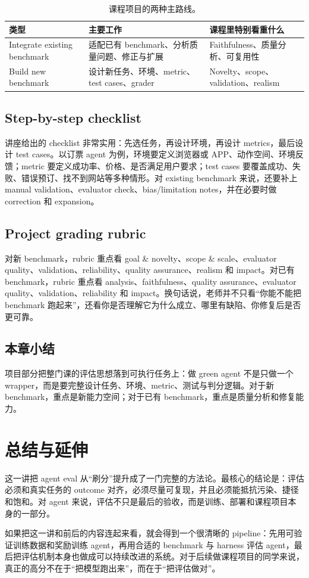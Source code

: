 \documentclass[a4paper]{article}
\begin{document}
\begin{table}[H]
\centering
\small
\begin{tabular}{@{}p{}p{}p{}@{}}
\toprule
类型 & 主要工作 & 课程里特别看重什么 \\
\midrule
Integrate existing benchmark & 适配已有 benchmark、分析质量问题、修正与扩展 & Faithfulness、质量分析、可复用性 \\
Build new benchmark & 设计新任务、环境、metric、test cases、grader & Novelty、scope、validation、realism \\
\bottomrule
\end{tabular}
\caption{课程项目的两种主路线。}
\end{table}

\subsection{Step-by-step checklist}
讲座给出的 checklist 非常实用：先选任务，再设计环境，再设计 metrics，最后设计 test cases。以订票 agent 为例，环境要定义浏览器或 APP、动作空间、环境反馈；metric 要定义成功率、价格、是否满足用户要求；test cases 要覆盖成功、失败、错误预订、找不到网站等多种情形。对 existing benchmark 来说，还要补上 manual validation、evaluator check、bias/limitation notes，并在必要时做 correction 和 expansion。

\subsection{Project grading rubric}
对新 benchmark，rubric 重点看 goal \& novelty、scope \& scale、evaluator quality、validation、reliability、quality assurance、realism 和 impact。对已有 benchmark，rubric 重点看 analysis、faithfulness、quality assurance、evaluator quality、validation、reliability 和 impact。换句话说，老师并不只看“你能不能把 benchmark 跑起来”，还看你是否理解它为什么成立、哪里有缺陷、你修复后是否更可靠。

\subsection{本章小结}
项目部分把整门课的评估思想落到可执行任务上：做 green agent 不是只做一个 wrapper，而是要完整设计任务、环境、metric、测试与判分逻辑。对于新 benchmark，重点是新能力空间；对于已有 benchmark，重点是质量分析和修复能力。

\section{总结与延伸}
这一讲把 agent eval 从“刷分”提升成了一门完整的方法论。最核心的结论是：评估必须和真实任务的 outcome 对齐，必须尽量可复现，并且必须能抵抗污染、捷径和饱和。对 agent 来说，评估不只是最后的验收，而是训练、部署和课程项目本身的一部分。

如果把这一讲和前后的内容连起来看，就会得到一个很清晰的 pipeline：先用可验证训练数据和奖励训练 agent，再用合适的 benchmark 与 harness 评估 agent，最后把评估机制本身也做成可以持续改进的系统。对于后续做课程项目的同学来说，真正的高分不在于“把模型跑出来”，而在于“把评估做对”。
\end{document}
